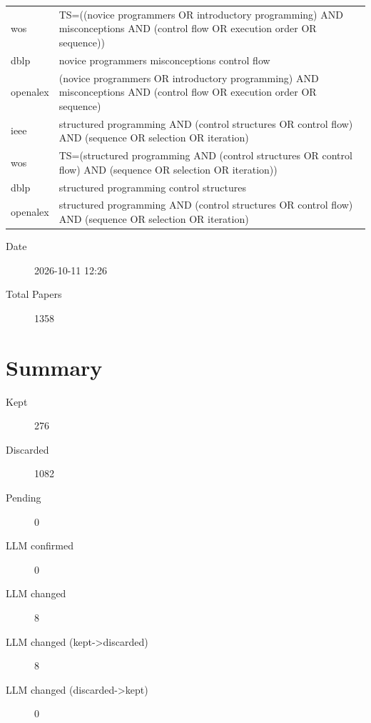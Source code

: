 \documentclass{article}
\begin{document}
\begin{longtable}{lp{10cm}}
wos & TS=((\textquotedbl{}novice programmers\textquotedbl{} OR \textquotedbl{}introductory programming\textquotedbl{}) AND misconceptions AND (\textquotedbl{}control flow\textquotedbl{} OR \textquotedbl{}execution order\textquotedbl{} OR sequence)) \\
dblp & novice programmers misconceptions control flow \\
openalex & (\textquotedbl{}novice programmers\textquotedbl{} OR \textquotedbl{}introductory programming\textquotedbl{}) AND misconceptions AND (\textquotedbl{}control flow\textquotedbl{} OR \textquotedbl{}execution order\textquotedbl{} OR sequence) \\
ieee & \textquotedbl{}structured programming\textquotedbl{} AND (\textquotedbl{}control structures\textquotedbl{} OR \textquotedbl{}control flow\textquotedbl{}) AND (sequence OR selection OR iteration) \\
wos & TS=(\textquotedbl{}structured programming\textquotedbl{} AND (\textquotedbl{}control structures\textquotedbl{} OR \textquotedbl{}control flow\textquotedbl{}) AND (sequence OR selection OR iteration)) \\
dblp & structured programming control structures \\
openalex & \textquotedbl{}structured programming\textquotedbl{} AND (\textquotedbl{}control structures\textquotedbl{} OR \textquotedbl{}control flow\textquotedbl{}) AND (sequence OR selection OR iteration) \\
\bottomrule
\end{longtable}

\begin{description}
\item[Date] 2026-10-11 12:26
\item[Total Papers] 1358
\end{description}

\section{Summary}
\begin{description}
\item[Kept] 276
\item[Discarded] 1082
\item[Pending] 0
\item[LLM confirmed] 0
\item[LLM changed] 8
\item[LLM changed (kept->discarded)] 8
\item[LLM changed (discarded->kept)] 0
\end{description}
\end{document}
